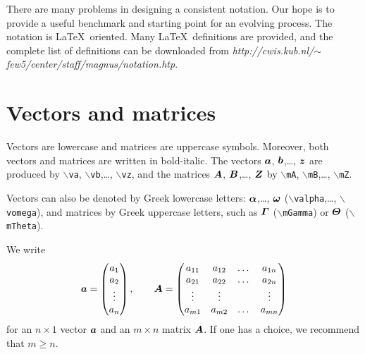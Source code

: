 \documentclass[11pt,dvips,a4paper]{article}
\newcommand{\type}[1]{{\tt$\backslash$#1}}
\begin{document}
There are many problems in designing a consistent notation.
Our hope is to provide a useful benchmark
and starting point for an evolving process.
The notation is \LaTeX\ oriented.
Many \LaTeX\ definitions are provided,
and the complete list of definitions can be downloaded from
{\it http:/\!/cwis.kub.nl/$\sim$few5/center/staff/magnus/notation.htp}.
%
\section{Vectors and matrices}
Vectors are lowercase and matrices are uppercase symbols.
Moreover, both vectors and matrices are written in bold-italic.
The vectors $\bm a$, $\bm b$,\dots, $\bm z$ are produced by
\type{va}, \type{vb},\dots, \type{vz},
and the matrices $\bm A$, $\bm B$,\dots, $\bm Z$ by
\type{mA}, \type{mB},\dots, \type{mZ}.

Vectors can also be denoted by Greek lowercase letters:
$\bm \alpha$,\dots, $\bm \omega$
(\type{valpha},\dots, \type{vomega}),
and matrices by Greek uppercase letters,
such as $\bm \varGamma$ (\type{mGamma})
or $\bm \varTheta$ (\type{mTheta}).

We write
$$
\bm a=
\begin{pmatrix}
a_1\\
a_2\\
\vdots\\
a_n
\end{pmatrix},
\qquad
\bm A=
\begin{pmatrix}
a_{11} & a_{12} &\dots & a_{1n}\\
a_{21} & a_{22} &\dots & a_{2n}\\
\vdots & \vdots && \vdots\\
a_{m1} & a_{m2} &\dots & a_{mn}\\
\end{pmatrix}
$$
for an $n\times 1$ vector $\bm a$ and an $m\times n$ matrix $\bm A$.
If one has a choice, we recommend that $m\geq n$.
\end{document}
